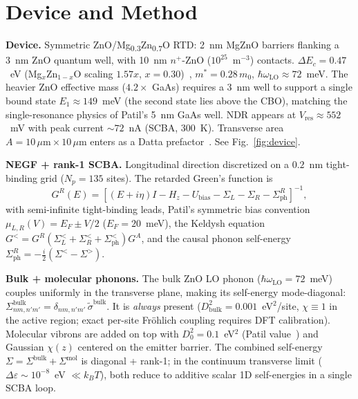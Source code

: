 \documentclass[conference]{IEEEtran}
\begin{document}
\section{Device and Method}
\textbf{Device.} Symmetric ZnO/Mg\textsubscript{0.3}Zn\textsubscript{0.7}O
RTD: 2~nm MgZnO barriers flanking a 3~nm ZnO quantum well, with
10~nm $n^+$-ZnO ($10^{25}$~m$^{-3}$) contacts.
$\Delta E_c = 0.47$~eV (Mg$_x$Zn$_{1-x}$O
scaling $1.57x$, $x = 0.30$)~\cite{mgzno_cbo}, $m^* = 0.28\,m_0$,
$\hbar\omega_{\mathrm{LO}} \approx 72$~meV.
The heavier ZnO effective mass ($4.2\times$ GaAs) requires a 3~nm well
to support a single bound state $E_1 \approx 149$~meV (the second state
lies above the CBO), matching the single-resonance physics of Patil's
5~nm GaAs well. NDR appears at $V_{\mathrm{res}} \approx 552$~mV with
peak current $\sim 72$~nA (SCBA, 300~K). Transverse area
$A = 10\,\mu\mathrm{m} \times 10\,\mu\mathrm{m}$
enters as a Datta prefactor~\cite{datta}. See Fig.~\ref{fig:device}.

\textbf{NEGF + rank-1 SCBA.} Longitudinal direction discretized on a
$0.2$~nm tight-binding grid ($N_p = 135$ sites). The retarded
Green's function is
\begin{equation}
G^R(E) = [(E + i\eta)I - H_z - U_{\mathrm{bias}} - \Sigma_L - \Sigma_R - \Sigma_{\mathrm{ph}}^R]^{-1},
\label{eq:GR}
\end{equation}
with semi-infinite tight-binding leads, Patil's symmetric bias convention
$\mu_{L,R}(V) = E_F \pm V/2$ ($E_F = 20$~meV), the Keldysh equation
$G^< = G^R(\Sigma_L^< + \Sigma_R^< + \Sigma_{\mathrm{ph}}^<)G^A$,
and the causal phonon self-energy
$\Sigma_{\mathrm{ph}}^R = -\tfrac{i}{2}(\Sigma^< - \Sigma^>)$.

\textbf{Bulk + molecular phonons.} The bulk ZnO LO phonon
($\hbar\omega_{\mathrm{LO}} = 72$~meV) couples uniformly in the
transverse plane, making its self-energy mode-diagonal:
$\Sigma^{\mathrm{bulk}}_{nm,n'm'} = \delta_{nm,n'm'}\,\tilde\sigma^{\mathrm{bulk}}$.
It is \emph{always} present ($D_{\mathrm{bulk}}^2 = 0.001$~eV$^2$/site,
$\chi \equiv 1$ in the active region; exact per-site Fröhlich coupling
requires DFT calibration). Molecular vibrons are added on top
with $D_0^2 = 0.1$~eV$^2$ (Patil value~\cite{patil2018}) and Gaussian
$\chi(z)$ centered on the emitter barrier. The combined self-energy
$\Sigma = \Sigma^{\mathrm{bulk}} + \Sigma^{\mathrm{mol}}$ is
diagonal + rank-1; in the continuum transverse limit
($\Delta\varepsilon \sim 10^{-8}$~eV $\ll k_BT$), both reduce to additive
scalar 1D self-energies in a single SCBA loop.
\end{document}
